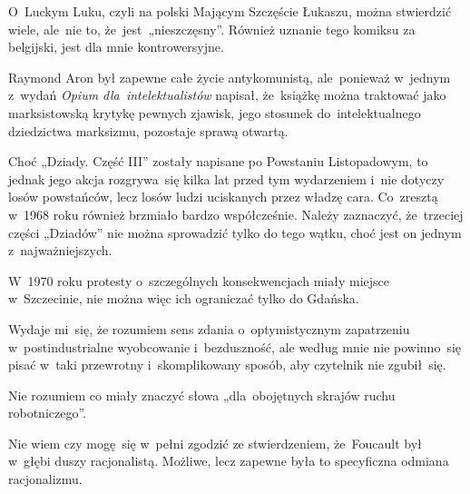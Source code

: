 \documentclass[a4paper,11pt]{article}
\begin{document}
\vspace{\spaceFour}


\start {} O~Luckym Luku, czyli na polski Mającym
Szczęście Łukaszu, można stwierdzić wiele, ale~nie to,
że~jest~„nieszczęsny”. Również uznanie tego komiksu za belgijski,
jest dla mnie kontrowersyjne.

\vspace{\spaceFour}


\start {} Raymond Aron był zapewne całe życie antykomunistą,
ale~ponieważ w~jednym z~wydań \emph{Opium dla~intelektualistów}
napisał, że~książkę można traktować jako marksistowską krytykę pewnych
zjawisk, jego stosunek do~intelektualnego dziedzictwa marksizmu,
pozostaje sprawą otwartą.

\vspace{\spaceFour}


\start {} Choć „Dziady. Część III” zostały napisane po
Powstaniu Listopadowym, to jednak jego akcja rozgrywa~się kilka lat
przed tym wydarzeniem i~nie dotyczy losów powstańców, lecz losów ludzi
uciskanych przez władzę cara. Co~zresztą w~1968 roku również brzmiało
bardzo współcześnie. Należy zaznaczyć, że~trzeciej części „Dziadów”
nie można sprowadzić tylko do tego wątku, choć jest on jednym
z~najważniejszych.

\vspace{\spaceFour}


\start {} W~1970 roku protesty o~szczególnych
konsekwencjach miały miejsce w~Szczecinie, nie można więc ich
ograniczać tylko do Gdańska.

\vspace{\spaceFour}


\start {} Wydaje mi~się, że rozumiem sens zdania
o~optymistycznym zapatrzeniu w~postindustrialne wyobcowanie
i~bezduszność, ale według mnie nie powinno~się pisać w~taki przewrotny
i~skomplikowany sposób, aby czytelnik nie zgubił~się.

\vspace{\spaceFour}


\start {} Nie rozumiem co miały znaczyć słowa
„dla~obojętnych skrajów ruchu robotniczego”.

\vspace{\spaceFour}


\start {} Nie wiem czy mogę~się w~pełni zgodzić ze
stwierdzeniem, że~Foucault był w~głębi duszy racjonalistą. Możliwe,
lecz zapewne była to specyficzna odmiana racjonalizmu.
\end{document}
